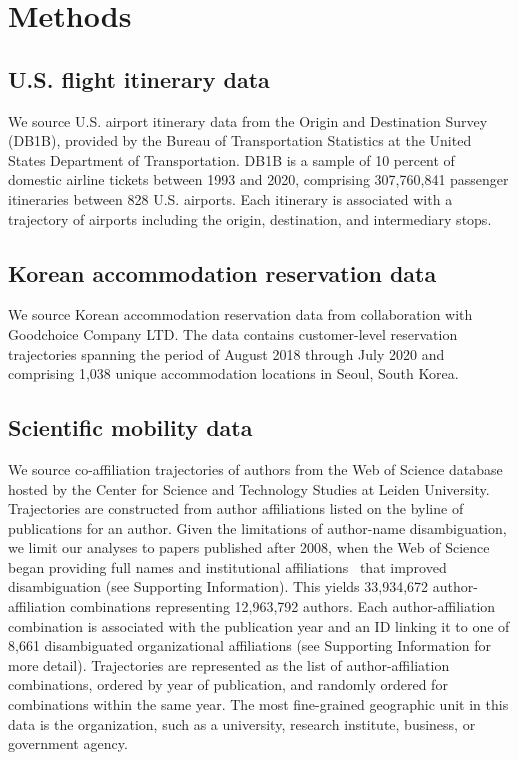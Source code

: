 \documentclass[12pt]{article} %
\def\SI{Supporting Information}
\begin{document}
%
%
\section*{Methods}
\label{sec:datamethods} %

\subsection*{U.S. flight itinerary data}
We source U.S. airport itinerary data from the Origin and Destination Survey (DB1B), provided by the Bureau of Transportation Statistics at the United States Department of Transportation.
DB1B is a sample of 10 percent of domestic airline tickets between 1993 and 2020, comprising 307,760,841 passenger itineraries between 828 U.S. airports.
Each itinerary is associated with a trajectory of airports including the origin, destination, and intermediary stops.


\subsection*{Korean accommodation reservation data}
We source Korean accommodation reservation data from collaboration with Goodchoice Company LTD.
The data contains customer-level reservation trajectories spanning the period of August 2018 through July 2020 and comprising 1,038 unique accommodation locations in Seoul, South Korea.


\subsection*{Scientific mobility data}
We source co-affiliation trajectories of authors from the Web of Science database hosted by the Center for Science and Technology Studies at Leiden University.
Trajectories are constructed from author affiliations listed on the byline of publications for an author.
Given the limitations of author-name disambiguation, we limit our analyses to papers published after 2008, when the Web of Science began providing full names and institutional affiliations~\autocite{caron2014disambiguation} that improved disambiguation (see \SI).
This yields 33,934,672 author-affiliation combinations representing 12,963,792 authors.
Each author-affiliation combination is associated with the publication year and an ID linking it to one of 8,661 disambiguated organizational affiliations (see \SI{} for more detail).
Trajectories are represented as the list of author-affiliation combinations, ordered by year of publication, and randomly ordered for combinations within the same year. The most fine-grained geographic unit in this data is the organization, such as a university, research institute, business, or government agency.
\end{document}
